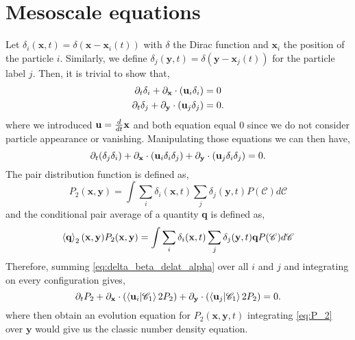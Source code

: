 \section{Mesoscale equations}

Let $\delta_i(\textbf{x},t) = \delta(\textbf{x} - \textbf{x}_i(t))$ with $\delta$ the Dirac function and $\textbf{x}_i$ the position of the particle $i$.  
Similarly, we define $\delta_j(\textbf{y},t) =\delta(\textbf{y} - \textbf{x}_j(t)) $ for the particle label $j$. 
Then, it is trivial to show that, 
\begin{align*}
    \partial_t \delta_i + \partial_\textbf{x} \cdot (\textbf{u}_i \delta_i) &= 0\\
    \partial_t \delta_j + \partial_\textbf{y} \cdot (\textbf{u}_j \delta_j) &= 0.
\end{align*}
where we introduced $\textbf{u} = \frac{d}{d t} \textbf{x}$
and both equation equal $0$ since we do not consider particle appearance or vanishing. 
Manipulating those equations we can then have, 
\begin{equation}
    \partial_t (\delta_j\delta_i) + \partial_\textbf{x} \cdot (\textbf{u}_i \delta_i\delta_j) + \partial_\textbf{y} \cdot (\textbf{u}_j \delta_i\delta_j) = 0.
    \label{eq:delta_beta_delat_alpha}
\end{equation}
The pair distribution function is defined as,
\begin{equation}
    P_2(\textbf{x},\textbf{y}) = \int \sum_i\delta_i(\textbf{x},t) \sum_j\delta_j(\textbf{y},t) P(\mathscr{C})d\mathscr{C}
\end{equation}
and the conditional pair average of a quantity \textbf{q} is defined as, 
\begin{equation}
    \left<\textbf{q}\right>_2(\textbf{x},\textbf{y})P_2(\textbf{x},\textbf{y}) = \int \sum_i\delta_i(\textbf{x},t) \sum_j\delta_j(\textbf{y},t) \textbf{q} P(\mathscr{C})d\mathscr{C}
\end{equation}
Therefore, summing \ref{eq:delta_beta_delat_alpha} over all $i$ and $j$ and integrating on every configuration gives, 
\begin{equation}
    \partial_t P_2 + \partial_\textbf{x} \cdot (\left<\textbf{u}_i | \mathscr{C}_1\right>{2}P_2) + \partial_\textbf{y} \cdot (\left<\textbf{u}_j | \mathscr{C}_1\right>{2}P_2) = 0.
    \label{eq:P_2}
\end{equation}
where then obtain an evolution equation for $P_2(\textbf{x},\textbf{y},t)$
integrating \ref{eq:P_2} over $\textbf{y}$ would give us the classic number density equation. 

